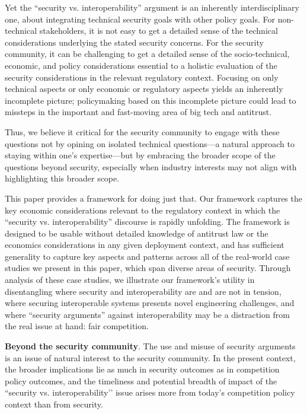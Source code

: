 \documentclass[letterpaper,twocolumn,10pt]{article}
\newcommand{\subh}[1]{\smallskip \noindent \textbf{{#1}}.}
\renewcommand{\paragraph}[1]{\subh{#1}}
\begin{document}
Yet the ``security vs. interoperability'' argument is an inherently interdisciplinary one, about integrating technical security goals with other policy goals. For non-technical stakeholders, it is not easy to get a detailed sense of the technical considerations underlying the stated security concerns. For the security community, it can be challenging to get a detailed sense of the socio-technical, economic, and policy considerations essential to a holistic evaluation of the security considerations in the relevant regulatory context. Focusing on only technical aspects or only economic or regulatory aspects yields an inherently incomplete picture; policymaking based on this incomplete picture could lead to missteps in the important and fast-moving area of big tech and antitrust. 

Thus, we believe it critical for the security community to
engage with these questions not by opining on isolated technical questions---a natural approach to staying within one's expertise---but by embracing the broader scope of the questions beyond security, especially when industry interests may not align with highlighting this broader scope.


This paper provides a framework for doing just that. Our framework captures the key economic considerations relevant to the regulatory context in which the ``security vs. interoperability'' discourse is rapidly unfolding. The framework is designed to be usable without detailed knowledge of antitrust law or the economics considerations in any given deployment context, and has sufficient generality to capture key aspects and patterns across all of the real-world case studies we present in this paper, which span diverse areas of security. Through analysis of these case studies, we illustrate our framework’s utility in disentangling where security and interoperability are and are not in tension, where securing interoperable systems presents novel engineering challenges, and where ``security arguments'' against interoperability may be a distraction from the real issue at hand: fair competition.

\smallskip
\paragraph{Beyond the security community}
The use and misuse of security arguments is an issue of natural interest to the security community.
In the present context, the broader implications lie as much in security outcomes as in competition policy outcomes, and the timeliness and potential breadth of impact of the ``security vs. interoperability’’ issue arises more from today’s competition policy context than from security.
\end{document}
